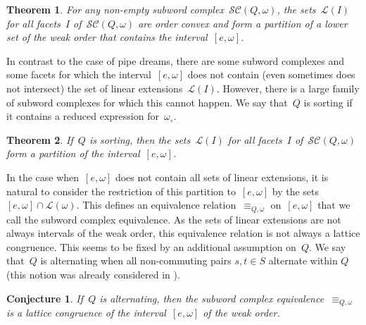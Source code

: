 \documentclass[reqno]{amsart}
\newtheorem{theoremA}{Theorem}
\newtheorem{conjectureA}{Conjecture}
\theoremstyle{definition}
\newcommand{\linearExtensions}{\mathcal{L}} %
\newcommand{\wo}{\omega_\circ} %
\newcommand{\subwordComplex}{\mathcal{SC}} %
\begin{document}
\begin{theoremA}
\label{thm:B}
For any non-empty subword complex~$\subwordComplex(Q, \omega)$, the sets~$\linearExtensions(I)$ for all facets~$I$ of~$\subwordComplex(Q, \omega)$ are order convex and form a partition of a lower set of the weak order that contains the interval~$[e, \omega]$.
\end{theoremA}

In contrast to the case of pipe dreams, there are some subword complexes and some facets for which the interval~$[e, \omega]$ does not contain (even sometimes does not intersect) the set of linear extensions~$\linearExtensions(I)$.
However, there is a large family of subword complexes for which this cannot happen.
We say that~$Q$ is sorting if it contains a reduced expression for~$\wo$.

\begin{theoremA}
\label{thm:C}
If~$Q$ is sorting, then the sets~$\linearExtensions(I)$ for all facets~$I$ of~$\subwordComplex(Q, \omega)$ form a partition of the interval~$[e, \omega]$.
\end{theoremA}

In the case when~$[e, \omega]$ does not contain all sets of linear extensions, it is natural to consider the restriction of this partition to~$[e, \omega]$ by the sets~$[e, \omega] \cap \linearExtensions(\omega)$.
This defines an equivalence relation~$\equiv_{Q, \omega}$ on~$[e, \omega]$ that we call the subword complex equivalence.
As the sets of linear extensions are not always intervals of the weak order, this equivalence relation is not always a lattice congruence.
This seems to be fixed by an additional assumption on~$Q$.
We say that~$Q$ is alternating when all non-commuting pairs $s, t\in S$ alternate within $Q$ (this notion was already considered in \cite{PilaudSantos-brickPolytope, CeballosLabbeStump}).

\begin{conjectureA}
\label{conj:A}
If~$Q$ is alternating, then the subword complex equivalence~$\equiv_{Q, \omega}$ is a lattice congruence of the interval~$[e, \omega]$ of the weak order.
\end{conjectureA}
\end{document}

